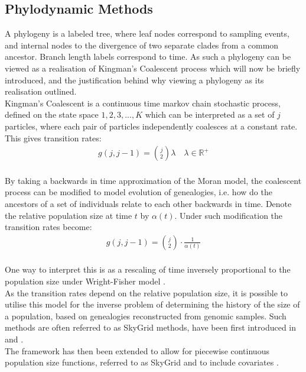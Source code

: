 \documentclass{ieeeaccess}
\newcommand{\R}{\mathbb{R}}
\theoremstyle{definition}
\begin{document}
\subsection{Phylodynamic Methods}
A phylogeny is a labeled tree, where leaf nodes correspond to sampling events, and internal nodes to the divergence of two separate clades from a common ancestor. Branch length labels correspond to time. As such a phylogeny can be viewed as a realisation of Kingman's Coalescent process which will now be briefly introduced, and the justification behind why viewing a phylogeny as its realisation outlined.\\
Kingman's Coalescent is a continuous time markov chain stochastic process, defined on the state space ${1,2,3, ... ,K}$ which can be interpreted as a set of $j$ particles, where each pair of particles independently coalesces at a constant rate. This gives transition rates:
\begin{gather}
g(j, j-1) = \binom{j}{2}\lambda\quad\lambda\in\R^+
\end{gather}
\cite{kingman_coalescent_1982}\\
By taking a backwards in time approximation of the Moran model, the coalescent process can be modified to model evolution of genealogies, i.e. how do the ancestors of a set of individuals relate to each other backwards in time. Denote the relative population size at time $t$ by $\alpha(t)$. Under such modification the transition rates become:
\begin{gather}
g(j, j-1) = \binom{j}{2}\cdot\frac{1}{\alpha(t)}
\end{gather}
\cite{griffiths_sampling_1994}\\
One way to interpret this is as a rescaling of time inversely proportional to the population size under Wright-Fisher model \cite{hein_gene_2004}.\\
As the transition rates depend on the relative population size, it is possible to utilise this model for the inverse problem of determining the history of the size of a population, based on genealogies reconstructed from genomic samples.
Such methods are often referred to as SkyGrid methods, have been first introduced in \cite{pybus_integrated_2000} and \cite{drummond_estimating_2002}.\\
The framework has then been extended to allow for piecewise continuous population size functions, referred to as SkyGrid \cite{gill_improving_2013} and to include covariates \cite{gill_understanding_2016}.
\end{document}
